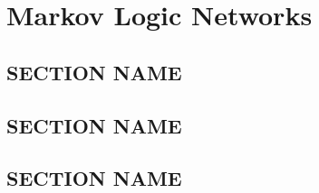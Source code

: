 \chapter{Markov Logic Networks}


\section{SECTION NAME}

\section{SECTION NAME}

\section{SECTION NAME}
